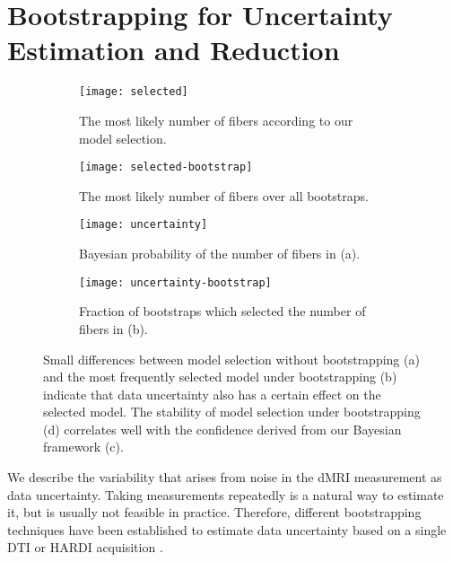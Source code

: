 \section{Bootstrapping for Uncertainty Estimation and Reduction}
\label{sec:bootstrapping}
\begin{figure*}[t]
	\centering
	\begin{subfigure}[b]{0.23\linewidth}
		\texttt{[image: selected]}
		\caption{The most likely number of fibers according to our model
		selection.}
		\label{fig:selected-uncertainty:rank-original}
              \end{subfigure}
              \hspace{0.01\linewidth}
	\begin{subfigure}[b]{0.23\linewidth}
		\texttt{[image: selected-bootstrap]}
		\caption{The most likely number of fibers over all
		bootstraps.}
		\label{fig:selected-uncertainty:rank}
              \end{subfigure}
              \hspace{0.01\linewidth}
	\begin{subfigure}[b]{0.23\linewidth}
		\texttt{[image: uncertainty]}
		\caption{Bayesian probability of the number of fibers in (a).}
		\label{fig:selected-uncertainty:unc-original}
              \end{subfigure}
              \hspace{0.01\linewidth}
	\begin{subfigure}[b]{0.23\linewidth}
		\texttt{[image: uncertainty-bootstrap]}
		\caption{Fraction of bootstraps which selected the number of fibers in (b).}
		\label{fig:selected-uncertainty:unc}
	\end{subfigure}
	\caption{Small differences between model selection without bootstrapping (a) and the most frequently selected model under bootstrapping (b) indicate that data uncertainty also has a certain effect on the selected model. The stability of model selection under bootstrapping (d) correlates well with the confidence derived from our Bayesian framework (c).}
	\label{fig:selected-uncertainty}
\end{figure*}

We describe the variability that arises from noise in the dMRI measurement as data uncertainty. Taking measurements repeatedly is a natural way to estimate it, but is usually not feasible in practice. Therefore, different bootstrapping techniques have been established to estimate data uncertainty based on a single DTI or HARDI acquisition \cite{Chung:2006,Jones:2008}.

